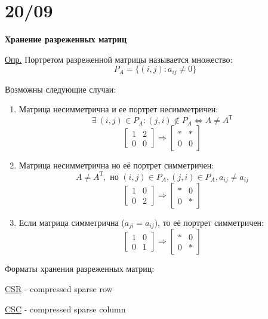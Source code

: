 \documentclass{bmstu}
\begin{document}
	
	\section*{20/09}
	
	\begin{center}
		\textbf{Хранение разреженных матриц}
	\end{center}
	
		\underline{Опр.} Портретом разреженной матрицы называется множество:
		\[
		P_A=\{(i,j):a_{ij}\neq0\}
		\]
		
		Возможны следующие случаи:
		\begin{enumerate}
			\item Матрица несимметрична и ее портрет несимметричен:
			\[
			\exists \ (i, j) \in P_A: (j, i) \notin P_A \Leftrightarrow A\neq A^{\text{Т}}
			\]
			\[
			\begin{bmatrix}
				1&2 \\ 0&0
			\end{bmatrix}
			\Rightarrow 
			\begin{bmatrix}
				\ast&\ast \\ 0&0
			\end{bmatrix}
			\]
			\item Матрица несимметрична но её портрет симметричен:
			\[
			A\neq A^{\text{Т}}, \text{ но } (i, j) \in P_A, (j, i) \in P_A, a_{ij}\neq a_{ij}
			\]
			\[
			\begin{bmatrix}
				1&0 \\ 0&2
			\end{bmatrix}
			\Rightarrow 
			\begin{bmatrix}
				\ast&0 \\ 0&\ast
			\end{bmatrix}
			\]
			\item Если матрица симметрична ($a_{ji}=a_{ij}$), то её портрет симметричен:
			\[
			\begin{bmatrix}
				1&0 \\ 0&1
			\end{bmatrix}
			\Rightarrow 
			\begin{bmatrix}
				\ast&0 \\ 0&\ast
			\end{bmatrix}
			\]
		\end{enumerate}
		
Форматы хранения разреженных матриц:
		
\underline{CSR} - compressed sparse row

\underline{CSC} - compressed sparse column
\end{document}
